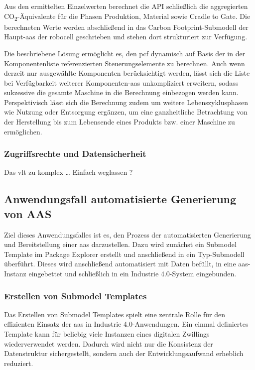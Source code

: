 Aus den ermittelten Einzelwerten berechnet die API schließlich die aggregierten CO\textsubscript{2}-Äquivalente für die Phasen Produktion, Material sowie Cradle to Gate. 
Die berechneten Werte werden abschließend in das Carbon Footprint-Submodell der Haupt-\acs{aas} der robocell geschrieben und stehen dort strukturiert zur Verfügung.

Die beschriebene Lösung ermöglicht es, den \acs{pcf} dynamisch auf Basis der in der Komponentenliste referenzierten Steuerungselemente zu berechnen. 
Auch wenn derzeit nur ausgewählte Komponenten berücksichtigt werden, lässt sich die Liste bei Verfügbarkeit weiterer Komponenten-\acs{aas} unkompliziert erweitern, sodass sukzessive die gesamte Maschine in die Berechnung einbezogen werden kann. 
Perspektivisch lässt sich die Berechnung zudem um weitere Lebenszyklusphasen wie Nutzung oder Entsorgung ergänzen, um eine ganzheitliche Betrachtung von der Herstellung bis zum Lebensende eines Produkts bzw. einer Maschine zu ermöglichen.

\subsubsection{Zugriffsrechte und Datensicherheit}
Das vlt zu komplex \dots
Einfach weglassen ? 
\newpage
\subsection{Anwendungsfall automatisierte Generierung von AAS}
Ziel dieses Anwendungsfalles ist es, den Prozess der automatisierten Generierung und Bereitstellung einer \acs{aas} darzustellen.
Dazu wird zunächst ein Submodel Template im Package Explorer erstellt und anschließend in ein Typ-Submodell überführt.
Dieses wird anschließend automatisiert mit Daten befüllt, in eine \acs{aas}-Instanz eingebettet und schließlich in ein Industrie 4.0-System eingebunden.

\subsubsection{Erstellen von Submodel Templates}
Das Erstellen von Submodel Templates spielt eine zentrale Rolle für den effizienten Einsatz der \acs{aas} in Industrie 4.0-Anwendungen. 
Ein einmal definiertes Template kann für beliebig viele Instanzen eines digitalen Zwillings wiederverwendet werden. 
Dadurch wird nicht nur die Konsistenz der Datenstruktur sichergestellt, sondern auch der Entwicklungsaufwand erheblich reduziert.

